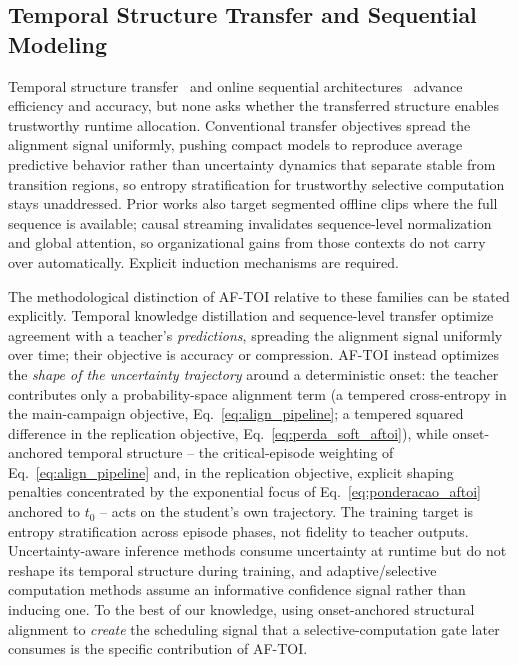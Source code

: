 \documentclass[a4paper,fleqn]{cas-dc}
\begin{document}
\subsection{Temporal Structure Transfer and Sequential Modeling}
\label{sec:rel_temporal}
Temporal structure transfer~\cite{hinton2015distilling,bajestani2020tkd,zheng2024tempdistiller} and online sequential architectures~\cite{zhao2022testra,lstr2021} advance efficiency and accuracy, but none asks whether the transferred structure enables trustworthy runtime allocation. Conventional transfer objectives spread the alignment signal uniformly, pushing compact models to reproduce average predictive behavior rather than uncertainty dynamics that separate stable from transition regions, so entropy stratification for trustworthy selective computation stays unaddressed. Prior works also target segmented offline clips where the full sequence is available; causal streaming invalidates sequence-level normalization and global attention, so organizational gains from those contexts do not carry over automatically. Explicit induction mechanisms are required.

{\color{\revcolor}The methodological distinction of \mbox{AF-TOI} relative to these
families can be stated explicitly. Temporal knowledge distillation and
sequence-level transfer optimize agreement with a teacher's
\emph{predictions}, spreading the alignment signal uniformly over time; their
objective is accuracy or compression. \mbox{AF-TOI} instead optimizes the
\emph{shape of the uncertainty trajectory} around a deterministic onset: the
teacher contributes only a probability-space alignment term (a tempered
cross-entropy in the main-campaign objective, Eq.~\ref{eq:align_pipeline};
a tempered squared difference in the replication objective,
Eq.~\ref{eq:perda_soft_aftoi}), while onset-anchored temporal structure --
the critical-episode weighting of Eq.~\ref{eq:align_pipeline} and, in the
replication objective, explicit shaping penalties concentrated by the
exponential focus of Eq.~\ref{eq:ponderacao_aftoi} anchored to $t_0$ --
acts on the student's own trajectory. The training target is
entropy stratification across episode phases, not fidelity to teacher
outputs. Uncertainty-aware inference methods consume
uncertainty at runtime but do not reshape its temporal structure during
training, and adaptive/selective computation methods assume an informative
confidence signal rather than inducing one. To the best of our knowledge,
using onset-anchored structural alignment to \emph{create} the scheduling
signal that a selective-computation gate later consumes is the specific
contribution of \mbox{AF-TOI}.}
\end{document}
